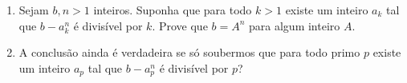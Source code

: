 \begin{enumerate}[label = (\alph*)]
	\item Sejam $b, n > 1$ inteiros. Suponha que para todo $k > 1$ existe um inteiro $a_k$ tal que $b - a_k^n$ é divisível por $k$. Prove que $b = A^n$ para algum inteiro $A$.
	\item A conclusão ainda é verdadeira se só soubermos que para todo primo $p$ existe um inteiro $a_p$ tal que $b - a_p^n$ é divisível por $p$?
\end{enumerate}
